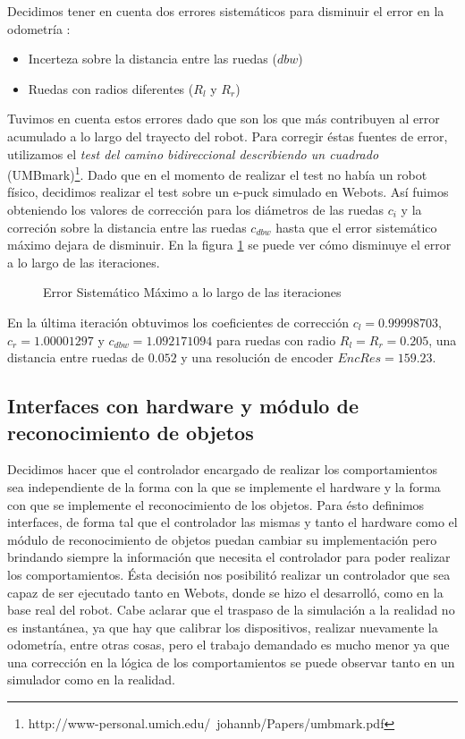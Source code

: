 Decidimos tener en cuenta dos errores sistem\'aticos para disminuir el error en la odometr\'ia :
\begin{itemize}
\item{Incerteza sobre la distancia entre las ruedas ($dbw$)}
\item{Ruedas con radios diferentes ($R_l$ y $R_r$)}
\end{itemize}
Tuvimos en cuenta estos errores dado que son los que m\'as contribuyen al error acumulado a lo
largo del trayecto del robot.
Para corregir \'estas fuentes de error, utilizamos el \emph{test del camino
bidireccional describiendo un cuadrado} (UMBmark)\footnote{http://www-personal.umich.edu/~johannb/Papers/umbmark.pdf}.
Dado que en el momento de realizar el test no hab\'ia un robot f\'isico, decidimos realizar el test sobre
un e-puck simulado en Webots.
As\'i fuimos obteniendo los valores de correcci\'on para los di\'ametros de las ruedas $c_i$ y la correci\'on
sobre la distancia entre las ruedas $c_{dbw}$ hasta que el error sistem\'atico m\'aximo dejara de disminuir. En la
figura \ref{fig:errsist} se puede ver c\'omo disminuye el error a lo largo de las iteraciones.

\begin{figure}[htp]
\begin{center}
\caption{Error Sistem\'atico M\'aximo a lo largo de las iteraciones}
\label{fig:errsist}
\end{center}
\end{figure}

En la \'ultima iteraci\'on obtuvimos los coeficientes de correcci\'on $c_l = 0.99998703$, $c_r = 1.00001297$
y $c_{dbw} = 1.092171094$ para ruedas con radio $R_l = R_r = 0.205$, una distancia entre ruedas de $0.052$ y
una resoluci\'on de encoder $EncRes = 159.23$.

\newpage
\subsection{Interfaces con hardware y m\'odulo de reconocimiento de objetos}
\label{interfaces}
Decidimos hacer que el controlador encargado de realizar los comportamientos sea independiente
de la forma con la que se implemente el hardware y la forma con que se implemente el reconocimiento
de los objetos. Para \'esto definimos interfaces, de forma tal que el controlador las mismas
y tanto el hardware como el m\'odulo de reconocimiento de objetos puedan cambiar su implementaci\'on
pero brindando siempre la informaci\'on que necesita el controlador para poder realizar
los comportamientos. \'Esta decisi\'on nos posibilit\'o realizar un controlador que sea capaz de ser
ejecutado tanto en Webots, donde se hizo el desarroll\'o, como en la base real del robot. Cabe aclarar
que el traspaso de la simulaci\'on a la realidad no es instant\'anea, ya que hay que calibrar los dispositivos,
realizar nuevamente la odometr\'ia, entre otras cosas, pero el trabajo demandado es mucho menor ya
que una correcci\'on en la l\'ogica de los comportamientos se puede observar tanto en un simulador como
en la realidad.

